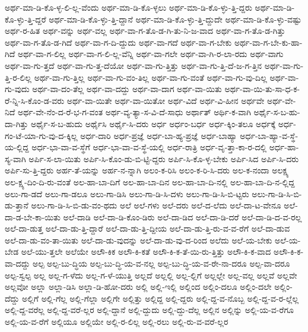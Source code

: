{ಅರ್ಥ-ಮಾ-ಡಿ-ಕೊ-ಳ್ಳ-ಲಿ-ಲ್ಲ-ವೆಂದು
ಅರ್ಥ-ಮಾ-ಡಿ-ಕೊ-ಳ್ಳಲು
ಅರ್ಥ-ಮಾ-ಡಿ-ಕೊ-ಳ್ಳು-ತ್ತಿ-ದ್ದರು
ಅರ್ಥ-ಮಾ-ಡಿ-ಕೊ-ಳ್ಳು-ತ್ತಿ-ದ್ದರೆ
ಅರ್ಥ-ಮಾ-ಡಿ-ಕೊ-ಳ್ಳು-ತ್ತಿ-ದ್ದಾನೆ
ಅರ್ಥ-ಮಾ-ಡಿ-ಕೊ-ಳ್ಳು-ತ್ತಿ-ದ್ದುದೇ
ಅರ್ಥ-ಮಾ-ಡಿ-ಕೊ-ಳ್ಳು-ವಷ್ಟು
ಅರ್ಥ-ರ-ಹಿತ
ಅರ್ಥ-ವನ್ನು
ಅರ್ಥ-ವಲ್ಲ
ಅರ್ಥ-ವಾ-ಗ-ತೊ-ಡ-ಗಿ-ತು-ನಿ-ಜ-ವಾದ
ಅರ್ಥ-ವಾ-ಗ-ತೊ-ಡ-ಗಿತ್ತು
ಅರ್ಥ-ವಾ-ಗ-ತೊ-ಡ-ಗಿದೆ
ಅರ್ಥ-ವಾ-ಗ-ದಿ-ದ್ದುದು
ಅರ್ಥ-ವಾ-ಗದೆ
ಅರ್ಥ-ವಾ-ಗ-ಬೇಕು
ಅರ್ಥ-ವಾ-ಗ-ಬೇ-ಕು-ಹಾ-ಗಿದೆ
ಅರ್ಥ-ವಾ-ಗ-ಲಿಲ್ಲ
ಅರ್ಥ-ವಾ-ಗ-ಲಿ-ಲ್ಲ-ವೆನ್ನಿ
ಅರ್ಥ-ವಾ-ಗಲೇ
ಅರ್ಥ-ವಾ-ಗಿ-ರ-ಲಾ-ರದು
ಅರ್ಥ-ವಾಗು
ಅರ್ಥ-ವಾ-ಗು-ತ್ತದೆ
ಅರ್ಥ-ವಾ-ಗು-ತ್ತ-ದೆಯೋ
ಅರ್ಥ-ವಾ-ಗು-ತ್ತಿತ್ತು
ಅರ್ಥ-ವಾ-ಗು-ತ್ತಿ-ದೆ-ಜ-ಗ-ತ್ತಿನ
ಅರ್ಥ-ವಾ-ಗು-ತ್ತಿ-ರ-ಲಿಲ್ಲ
ಅರ್ಥ-ವಾ-ಗು-ತ್ತಿಲ್ಲ
ಅರ್ಥ-ವಾ-ಗು-ವಂ-ತಿಲ್ಲ
ಅರ್ಥ-ವಾ-ಗು-ವಂತೆ
ಅರ್ಥ-ವಾ-ಗು-ವು-ದಿಲ್ಲ
ಅರ್ಥ-ವಾ-ಗು-ವುದು
ಅರ್ಥ-ವಾ-ದಂ-ತೆಲ್ಲ
ಅರ್ಥ-ವಾ-ದದ್ದು
ಅರ್ಥ-ವಾ-ದಾಗ
ಅರ್ಥ-ವಾ-ಯಿತು
ಅರ್ಥ-ವಾ-ಯಿ-ತು-ಸಾ-ಧ-ಕ-ರೆ-ನ್ನಿ-ಸಿ-ಕೊಂ-ಡ-ವರು
ಅರ್ಥ-ವಾ-ಯಿತೇ
ಅರ್ಥ-ವಾ-ಯಿತೋ
ಅರ್ಥ-ವಿದೆ
ಅರ್ಥ-ವಿ-ಹೀನ
ಅರ್ಥವೇ
ಅರ್ಥ-ವೇ-ನಿದೆ
ಅರ್ಥ-ವೇ-ನೆಂ-ದ-ರೆ-ಭ-ಗ-ವಂತ
ಅರ್ಥ-ವ್ಯ-ತ್ಯಾ-ಸ-ವಿ-ದೆ-ಸಾಧು
ಅರ್ಥಾತ್
ಅರ್ಥಿ-ಕ-ವಾಗಿ
ಅರ್ಥೈ-ಸ-ಬ-ಹು-ದಾ-ಗಿತ್ತು
ಅರ್ಥೈ-ಸ-ಬ-ಹುದು
ಅರ್ಥೈಸಿ
ಅರ್ಥೈ-ಸಿ-ದರು
ಅರ್ಧ
ಅರ್ಧಂ-ಬರ್ಧ
ಅರ್ಧ-ಕ್ಕಿಂ-ತಲೂ
ಅರ್ಧಕ್ಕೆ
ಅರ್ಧ-ಗಂ-ಟೆ-ಯಾ-ಗು-ವು-ದ-ಕ್ಕಿಲ್ಲ
ಅರ್ಧ-ದಾರಿ
ಅರ್ಧ-ಪ್ರಜ್ಞೆ
ಅರ್ಧ-ಬಾ-ಹ್ಯ-ಪ್ರಜ್ಞೆ
ಅರ್ಧ-ಬಾಹ್ಯಾ
ಅರ್ಧ-ಬಾ-ಹ್ಯಾ-ವ-ಸ್ಥೆ-ಯ-ಲ್ಲಿದ್ದ
ಅರ್ಧ-ಭಾ-ವಾ-ವ-ಸ್ಥೆಗೆ
ಅರ್ಧ-ಭಾ-ವಾ-ವ-ಸ್ಥೆ-ಯಲ್ಲಿ
ಅರ್ಧ-ರಾತ್ರಿ
ಅರ್ಧ-ವೃ-ತ್ತಾ-ಕಾ-ರ-ದಲ್ಲಿ
ಅರ್ಧ-ಹಾ-ಸ್ಯ-ವಾಗಿ
ಅರ್ಪಿ-ಸ-ಲಾ-ಯಿತು
ಅರ್ಪಿ-ಸಿ-ಕೊಂ-ಡು-ಬಿ-ಟ್ಟಿ-ದ್ದರು
ಅರ್ಪಿ-ಸಿ-ಕೊ-ಳ್ಳ-ಬೇಕು
ಅರ್ಪಿ-ಸಿದ
ಅರ್ಪಿ-ಸಿ-ದರು
ಅರ್ಪಿ-ಸು-ತ್ತಿ-ದ್ದರು
ಅರ್ಹ-ತೆ-ಯನ್ನು
ಅರ್ಹ-ನ-ನ್ನಾಗಿ
ಅಲಂ-ಕ-ರಿಸಿ
ಅಲಂ-ಕ-ರಿ-ಸಿ-ದರು
ಅಲ-ಕ-ನಂದಾ
ಅಲಕ್ಷ್ಯ
ಅಲ-ಕ್ಷ್ಯ-ದಿಂ-ದಿ-ರು-ವಂತೆ
ಅಲ-ಹಾ-ಬಾ-ದಿಗೆ
ಅಲ-ಹಾ-ಬಾ-ದಿನ
ಅಲ-ಹಾ-ಬಾ-ದಿ-ನಲ್ಲಿ
ಅಲ-ಹಾ-ಬಾ-ದಿ-ನ-ಲ್ಲಿದ್ದ
ಅಲು-ಗಾ-ಡದೆ
ಅಲು-ಗಾ-ಡಲೂ
ಅಲು-ಗಾ-ಡಿಸಿ
ಅಲು-ಗಾ-ಡಿ-ಸಿ-ದಳು
ಅಲು-ಗಾ-ಡಿ-ಸಿ-ಬಿ-ಟ್ಟರು
ಅಲು-ಗಾ-ಡಿ-ಸಿ-ಬಿ-ಡು-ತ್ತಾನೆ
ಅಲು-ಗಾ-ಡಿ-ಸಿ-ಬಿ-ಡು-ವಂ-ಥದು
ಅಲೆ
ಅಲೆ-ಗಳು
ಅಲೆ-ದರು
ಅಲೆ-ದ-ಲೆದು
ಅಲೆ-ದಾ-ಟ-ವೇನೂ
ಅಲೆ-ದಾ-ಡ-ಬೇ-ಕಾ-ಯಿತು
ಅಲೆ-ದಾಡಿ
ಅಲೆ-ದಾ-ಡಿ-ಕೊಂ-ಡಿರು
ಅಲೆ-ದಾ-ಡಿದ
ಅಲೆ-ದಾ-ಡಿ-ದರೆ
ಅಲೆ-ದಾ-ಡಿ-ದ-ವ-ರಲ್ಲ
ಅಲೆ-ದಾ-ಡುತ್ತ
ಅಲೆ-ದಾ-ಡು-ತ್ತಿ-ದ್ದಾರೆ
ಅಲೆ-ದಾ-ಡು-ತ್ತಿ-ದ್ದೀಯ
ಅಲೆ-ದಾ-ಡು-ತ್ತಿ-ರು-ವ-ವ-ರೆಗೆ
ಅಲೆ-ದಾ-ಡುವ
ಅಲೆ-ದಾ-ಡು-ವಂ-ತಾ-ಯಿತು
ಅಲೆ-ದಾ-ಡು-ವುದನ್ನು
ಅಲೆ-ದಾ-ಡು-ವು-ದ-ರಿಂದ
ಅಲೆದು
ಅಲೆ-ಯ-ಬೇಕು
ಅಲೆ-ಯ-ಬೇಡ
ಅಲೆ-ಯು-ತ್ತಲೇ
ಅಲೆಯೇ
ಅಲೌ-ಕಿಕ
ಅಲೌ-ಕಿ-ಕತೆ
ಅಲೌ-ಕಿ-ಕ-ತೆ-ಯಿ-ರು-ತ್ತಿತ್ತು
ಅಲೌ-ಕಿ-ಕ-ವಾದ
ಅಲೌ-ಕಿ-ಕ-ವಾ-ದದ್ದು
ಅಲ್ಪ
ಅಲ್ಪ-ಬು-ದ್ಧಿಯ
ಅಲ್ಪ-ಬು-ದ್ಧಿ-ಯ-ವ-ನಲ್ಲ
ಅಲ್ಪ-ಬು-ದ್ಧಿ-ಯ-ವ-ರೇ-ನಾ-ದರೂ
ಅಲ್ಪ-ವಾ-ದರೂ
ಅಲ್ಪ-ಸ್ವಲ್ಪ
ಅಲ್ಲ
ಅಲ್ಲ-ಗ-ಳೆದು
ಅಲ್ಲ-ಗ-ಳೆ-ಯುತ್ತಿ
ಅಲ್ಲದೆ
ಅಲ್ಲಲ್ಲಿ
ಅಲ್ಲ-ಲ್ಲಿಗೆ
ಅಲ್ಲಲ್ಲೇ
ಅಲ್ಲ-ವಲ್ಲ
ಅಲ್ಲವೆ
ಅಲ್ಲವೇ
ಅಲ್ಲವೋ
ಅಲ್ಲಾ
ಅಲ್ಲಾ-ಡಿಸಿ
ಅಲ್ಲಾ-ಡಿ-ಹೋ-ದರು
ಅಲ್ಲಿ
ಅಲ್ಲಿ-ಇಲ್ಲಿ
ಅಲ್ಲಿಂದ
ಅಲ್ಲಿಂ-ದಲೂ
ಅಲ್ಲಿಂ-ದಲೇ
ಅಲ್ಲಿಂ-ದೆದ್ದು
ಅಲ್ಲಿಗೆ
ಅಲ್ಲಿ-ಗೆಲ್ಲ
ಅಲ್ಲಿ-ಗೆಲ್ಲಾ
ಅಲ್ಲಿಗೇ
ಅಲ್ಲಿತ್ತು
ಅಲ್ಲಿದ್ದ
ಅಲ್ಲಿ-ದ್ದರು
ಅಲ್ಲಿ-ದ್ದ-ವ-ನೊಬ್ಬ
ಅಲ್ಲಿ-ದ್ದ-ವ-ರ-ಲ್ಲೆಲ್ಲ
ಅಲ್ಲಿ-ದ್ದ-ವರೆಲ್ಲ
ಅಲ್ಲಿ-ದ್ದ-ವರೆ-ಲ್ಲರ
ಅಲ್ಲಿ-ದ್ದಾನೆ
ಅಲ್ಲಿ-ದ್ದುದು
ಅಲ್ಲಿ-ದ್ದು-ದೆಲ್ಲ
ಅಲ್ಲಿನ
ಅಲ್ಲಿನ್ನು
ಅಲ್ಲಿ-ಯ-ವ-ರೆಗೂ
ಅಲ್ಲಿ-ಯ-ವ-ರೆಗೆ
ಅಲ್ಲಿಯೂ
ಅಲ್ಲಿಯೇ
ಅಲ್ಲಿ-ರ-ಲಿಲ್ಲ
ಅಲ್ಲಿ-ರಲು
ಅಲ್ಲಿ-ರು-ವ-ವರೆ-ಲ್ಲರ
}
